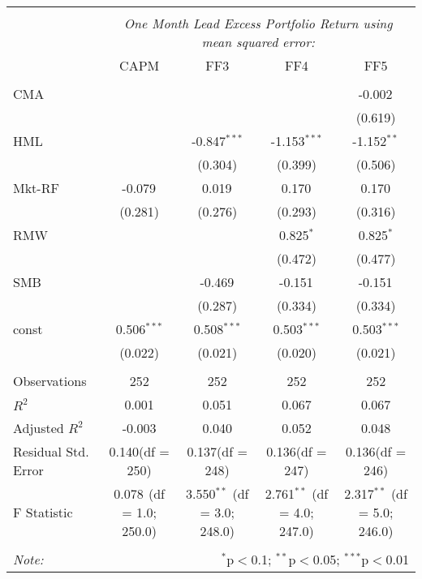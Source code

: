 \begin{table}[!htbp] \centering
\begin{tabular}{@{\extracolsep{5pt}}lcccc}
\\[-1.8ex]\hline
\hline \\[-1.8ex]
& \multicolumn{4}{c}{\textit{One Month Lead Excess Portfolio Return using mean squared error:}} \
\cr \cline{4-5}
\\[-1.8ex] & CAPM & FF3 & FF4 & FF5 \\
\hline \\[-1.8ex]
 CMA & & & & -0.002$^{}$ \\
  & & & & (0.619) \\
 HML & & -0.847$^{***}$ & -1.153$^{***}$ & -1.152$^{**}$ \\
  & & (0.304) & (0.399) & (0.506) \\
 Mkt-RF & -0.079$^{}$ & 0.019$^{}$ & 0.170$^{}$ & 0.170$^{}$ \\
  & (0.281) & (0.276) & (0.293) & (0.316) \\
 RMW & & & 0.825$^{*}$ & 0.825$^{*}$ \\
  & & & (0.472) & (0.477) \\
 SMB & & -0.469$^{}$ & -0.151$^{}$ & -0.151$^{}$ \\
  & & (0.287) & (0.334) & (0.334) \\
 const & 0.506$^{***}$ & 0.508$^{***}$ & 0.503$^{***}$ & 0.503$^{***}$ \\
  & (0.022) & (0.021) & (0.020) & (0.021) \\
\hline \\[-1.8ex]
 Observations & 252 & 252 & 252 & 252 \\
 $R^2$ & 0.001 & 0.051 & 0.067 & 0.067 \\
 Adjusted $R^2$ & -0.003 & 0.040 & 0.052 & 0.048 \\
 Residual Std. Error & 0.140(df = 250) & 0.137(df = 248) & 0.136(df = 247) & 0.136(df = 246)  \\
 F Statistic & 0.078$^{}$ (df = 1.0; 250.0) & 3.550$^{**}$ (df = 3.0; 248.0) & 2.761$^{**}$ (df = 4.0; 247.0) & 2.317$^{**}$ (df = 5.0; 246.0) \\
\hline
\hline \\[-1.8ex]
\textit{Note:} & \multicolumn{4}{r}{$^{*}$p$<$0.1; $^{**}$p$<$0.05; $^{***}$p$<$0.01} \\
\end{tabular}
\end{table}
